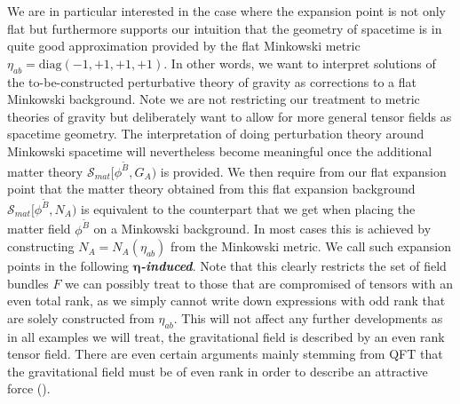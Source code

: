 We are in particular interested in the case where the expansion point is not only flat but furthermore supports our intuition that the geometry of spacetime is in quite good approximation provided by the flat Minkowski metric $\eta_{ab} = \mathrm{diag}(-1,+1,+1,+1)$. 
%
%
In other words, we want to interpret solutions of the to-be-constructed perturbative theory of gravity as corrections to a flat Minkowski background. Note we are not restricting our treatment to metric theories of gravity but deliberately want to allow for more general tensor fields as spacetime geometry.
The interpretation of doing perturbation theory around Minkowski spacetime will nevertheless become meaningful once the additional matter theory $\mathcal{S}_{mat}[\phi^{\tilde{B}},G_A)$ is provided. We then require from our flat expansion point that the matter theory obtained from this flat expansion background $\mathcal{S}_{mat}[\phi^{\tilde{B}},N_A)$ is equivalent to the counterpart that we get when placing the matter field $\phi^{\tilde{B}}$ on a Minkowski background. 
In most cases this is achieved by constructing $N_A = N_A(\eta_{ab})$ from the Minkowski metric. We call such expansion points in the following \textit{\textbf{$\boldsymbol{\eta}$-induced}}. Note that this clearly restricts the set of field bundles $F$ we can possibly treat to those that are compromised of tensors with an even total rank, as we simply cannot write down expressions with odd rank that are solely constructed from $\eta_{ab}$. This will not affect any further developments as in all examples we will treat, the gravitational field is described by an even rank tensor field. There are even certain arguments mainly stemming from QFT that the gravitational field must be of even rank in order to describe an attractive force (\cite{vecchiato2017variational}). 

